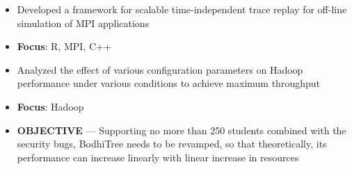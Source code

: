 \documentclass[10pt,a4paper]{altacv}
\begin{document}
\begin{itemize}
	\item Developed a framework for scalable time-independent trace replay for off-line simulation of MPI applications
	\item \textbf{Focus}: R, MPI, C++
\end{itemize}

\divider

\begin{itemize}
	\item Analyzed the effect of various configuration parameters on Hadoop performance under various conditions to achieve maximum throughput
	\item \textbf{Focus}: Hadoop
\end{itemize}

\begin{itemize}
	\item \textbf{OBJECTIVE} --- Supporting no more than 250 students combined with the security bugs, BodhiTree needs to be revamped, so that theoretically, its performance can increase linearly with linear increase in resources
\end{itemize}
\end{document}
